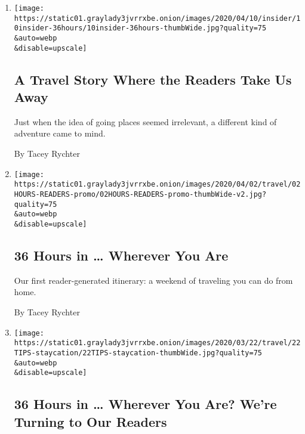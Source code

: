 \begin{enumerate}
\def\labelenumi{\arabic{enumi}.}
\item
  \href{/2020/04/10/reader-center/reporter-travel-36hours.html}{}

  \texttt{[image: https://static01.graylady3jvrrxbe.onion/images/2020/04/10/insider/10insider-36hours/10insider-36hours-thumbWide.jpg?quality=75\\\&auto=webp\\\&disable=upscale]}

  \hypertarget{a-travel-story-where-the-readers-take-us-away}{%
  \subsection{A Travel Story Where the Readers Take Us
  Away}\label{a-travel-story-where-the-readers-take-us-away}}

  Just when the idea of going places seemed irrelevant, a different kind
  of adventure came to mind.

  By Tacey Rychter
\item
  \href{/2020/04/02/travel/36-hours-quarantine.html}{}

  \texttt{[image: https://static01.graylady3jvrrxbe.onion/images/2020/04/02/travel/02HOURS-READERS-promo/02HOURS-READERS-promo-thumbWide-v2.jpg?quality=75\\\&auto=webp\\\&disable=upscale]}

  \hypertarget{36-hours-in--wherever-you-are}{%
  \subsection{36 Hours in \ldots{} Wherever You
  Are}\label{36-hours-in--wherever-you-are}}

  Our first reader-generated itinerary: a weekend of traveling you can
  do from home.

  By Tacey Rychter
\item
  \href{/2020/03/19/travel/36-hours-readers.html}{}

  \texttt{[image: https://static01.graylady3jvrrxbe.onion/images/2020/03/22/travel/22TIPS-staycation/22TIPS-staycation-thumbWide.jpg?quality=75\\\&auto=webp\\\&disable=upscale]}

  \hypertarget{36-hours-in--wherever-you-are-were-turning-to-our-readers}{%
  \subsection{36 Hours in \ldots{} Wherever You Are? We're Turning to
  Our
  Readers}\label{36-hours-in--wherever-you-are-were-turning-to-our-readers}}


\end{enumerate}
